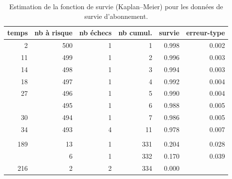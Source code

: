 \documentclass[
  11pt,
  letterpaper,
]{book}
\newenvironment{Shaded}{\begin{snugshade}}{\end{snugshade}}
\newcommand{\AttributeTok}[1]{\textcolor[rgb]{0.40,0.45,0.13}{#1}}
\newcommand{\CommentTok}[1]{\textcolor[rgb]{0.37,0.37,0.37}{#1}}
\newcommand{\DecValTok}[1]{\textcolor[rgb]{0.68,0.00,0.00}{#1}}
\newcommand{\FunctionTok}[1]{\textcolor[rgb]{0.28,0.35,0.67}{#1}}
\newcommand{\NormalTok}[1]{\textcolor[rgb]{0.00,0.23,0.31}{#1}}
\newcommand{\OtherTok}[1]{\textcolor[rgb]{0.00,0.23,0.31}{#1}}
\newcommand{\SpecialCharTok}[1]{\textcolor[rgb]{0.37,0.37,0.37}{#1}}
\newcommand{\StringTok}[1]{\textcolor[rgb]{0.13,0.47,0.30}{#1}}
\theoremstyle{definition}
\theoremstyle{remark}
\begin{document}
\hypertarget{tbl-survie1-tableau}{}
\begin{table}
\caption{\label{tbl-survie1-tableau}Estimation de la fonction de survie (Kaplan--Meier) pour les données de
survie d'abonnement. }\tabularnewline

\centering
\begin{tabular}{rrrrrr}
\toprule
temps & nb à risque & nb échecs & nb cumul. & survie & erreur-type\\
\midrule
2 & 500 & 1 & 1 & 0.998 & 0.002\\
11 & 499 & 1 & 2 & 0.996 & 0.003\\
14 & 498 & 1 & 3 & 0.994 & 0.003\\
18 & 497 & 1 & 4 & 0.992 & 0.004\\
27 & 496 & 1 & 5 & 0.990 & 0.004\\
\addlinespace
29 & 495 & 1 & 6 & 0.988 & 0.005\\
30 & 494 & 1 & 7 & 0.986 & 0.005\\
34 & 493 & 4 & 11 & 0.978 & 0.007\\
 &  &  &  &  & \\
189 & 13 & 1 & 331 & 0.204 & 0.028\\
\addlinespace
202 & 6 & 1 & 332 & 0.170 & 0.039\\
216 & 2 & 2 & 334 & 0.000 & \\
\bottomrule
\end{tabular}
\end{table}

\begin{Shaded}
\end{Shaded}
\end{document}
